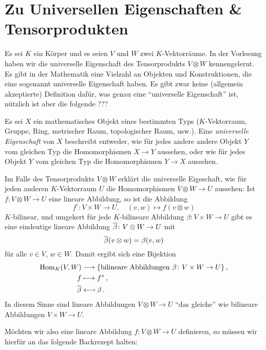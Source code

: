 \section*{Zu Universellen Eigenschaften \& Tensorprodukten}

Es sei $K$ ein Körper und es seien $V$ und $W$ zwei $K$-Vektorräume.
In der Vorlesung haben wir die universelle Eigenschaft des Tensorprodukts $V \otimes W$ kennengelernt.
Es gibt in der Mathematik eine Vielzahl an Objekten und Konstruktionen, die eine sogenannt universelle Eigenschaft haben.
Es gibt zwar keine (allgemein akzeptierte) Definition dafür, was genau eine \enquote{universelle Eigenschaft} ist, nützlich ist aber die folgende ???
 
\begin{idea}
  Es sei $X$ ein mathematisches Objekt eines bestimmten Typs ($K$-Vektorraum, Gruppe, Ring, metrischer Raum, topologischer Raum, usw.).
  Eine \emph{universelle Eigenschaft} von $X$ beschreibt entweder, wie für jedes andere andere Objekt $Y$ vom gleichen Typ die Homomorphismen $X \to Y$ aussehen, oder wie für jedes Objekt $Y$ vom gleichen Typ die Homomorphismen $Y \to X$ aussehen.
\end{idea}

Im Falle des Tensorprodukts $V \otimes W$ erklärt die universelle Eigeschaft, wie für jeden anderen $K$-Vektorraum $U$ die Homomorphismen $V \otimes W \to U$ aussehen:
Ist $f \colon V \otimes W \to U$ eine lineare Abbildung, so ist die Abbildung
\[
          f^\circ
  \colon  V \times W
  \to     U,
  \quad   (v,w)
  \mapsto f(v \otimes w)
\]
$K$-bilinear, und umgekert für jede $K$-bilineare Abbildung $\beta \colon V \times W \to U$ gibt es eine eindeutige lineare Abbildung $\overline{\beta} \colon V \otimes W \to U$ mit
\[
    \overline{\beta}(v \otimes w)
  = \beta(v,w)
\]
für alle $v \in V$, $w \in W$.
Damit ergibt sich eine Bijektion
\begin{align*}
                    \operatorname{Hom}_K(V,W)
  &\longrightarrow  \{ \text{bilineare Abbildungen $\beta \colon V \times W \to U$} \} \,,  \\
                    f
  &\longmapsto      f^\circ \,, \\
                    \overline{\beta}
  &\longmapsfrom    \beta \,.
\end{align*}
In diesem Sinne sind lineare Abbildungen $V \otimes W \to U$ \enquote{das gleiche} wie bilineare Abbildungen $V \times W \to U$.

Möchten wir also eine lineare Abbildung $f \colon V \otimes W \to U$ definieren, so müssen wir hierfür an das folgende Backrezept halten:

